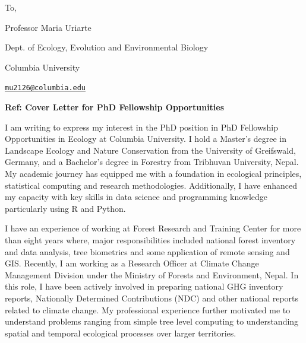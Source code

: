 \documentclass[
]{article}
\author{}
\date{\vspace{-2.5em}}
\begin{document}

To,

Professor Maria Uriarte

Dept. of Ecology, Evolution and Environmental Biology

Columbia University

\href{mailto:mu2126@columbia.edu}{\nolinkurl{mu2126@columbia.edu}}

\begin{centering}

\bf{Ref: Cover Letter for PhD Fellowship Opportunities}

\end{centering}

I am writing to express my interest in the PhD position in PhD
Fellowship Opportunities in Ecology at Columbia University. I hold a
Master's degree in Landscape Ecology and Nature Conservation from the
University of Greifswald, Germany, and a Bachelor's degree in Forestry
from Tribhuvan University, Nepal. My academic journey has equipped me
with a foundation in ecological principles, statistical computing and
research methodologies. Additionally, I have enhanced my capacity with
key skills in data science and programming knowledge particularly using
R and Python.

I have an experience of working at Forest Research and Training Center
for more than eight years where, major responsibilities included
national forest inventory and data analysis, tree biometrics and some
application of remote sensing and GIS. Recently, I am working as a
Research Officer at Climate Change Management Division under the
Ministry of Forests and Environment, Nepal. In this role, I have been
actively involved in preparing national GHG inventory reports,
Nationally Determined Contributions (NDC) and other national reports
related to climate change. My professional experience further motivated
me to understand problems ranging from simple tree level computing to
understanding spatial and temporal ecological processes over larger
territories.
\end{document}
